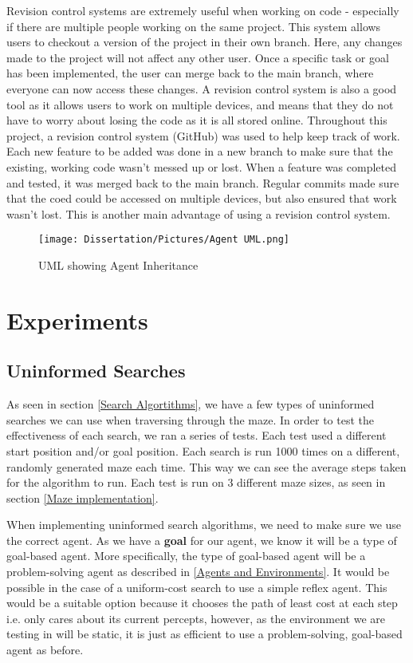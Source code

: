 \documentclass[]{final_report}
\renewcommand{\arraystretch}{2}
\begin{document}
Revision control systems are extremely useful when working on code - especially if there are multiple people working on the same project. This system allows users to checkout a version of the project in their own branch. Here, any changes made to the project will not affect any other user. Once a specific task or goal has been implemented, the user can merge back to the main branch, where everyone can now access these changes. A revision control system is also a good tool as it allows users to work on multiple devices, and means that they do not have to worry about losing the code as it is all stored online. Throughout this project, a revision control system (GitHub) was used to help keep track of work. Each new feature to be added was done in a new branch to make sure that the existing, working code wasn't messed up or lost. When a feature was completed and tested, it was merged back to the main branch. Regular commits made sure that the coed could be accessed on multiple devices, but also ensured that work wasn't lost. This is another main advantage of using a revision control system. 


\newpage
\begin{sidewaysfigure}[!htp]
    \centering
    \texttt{[image: Dissertation/Pictures/Agent UML.png]}
    \caption{UML showing Agent Inheritance}
    \label{fig:agentUML}
\end{sidewaysfigure}
\newpage
\chapter{Experiments}
\renewcommand{\arraystretch}{1}
\section{Uninformed Searches}\label{unininformed search implementation}

As seen in section \ref{Search Algortithms}, we have a few types of uninformed searches we can use when traversing through the maze. In order to test the effectiveness of each search, we ran a series of tests. Each test used a different start position and/or goal position. Each search is run 1000 times on a different, randomly generated maze each time. This way we can see the average steps taken for the algorithm to run. Each test is run on 3 different maze sizes, as seen in section \ref{Maze implementation}.

When implementing uninformed search algorithms, we need to make sure we use the correct agent. As we have a \textbf{goal} for our agent, we know it will be a type of goal-based agent. More specifically, the type of goal-based agent will be a problem-solving agent as described in \ref{Agents and Environments}. It would be possible in the case of a uniform-cost search to use a simple reflex agent. This would be a suitable option because it chooses the path of least cost at each step i.e. only cares about its current percepts, however, as the environment we are testing in will be static, it is just as efficient to use a problem-solving, goal-based agent as before.
\end{document}
